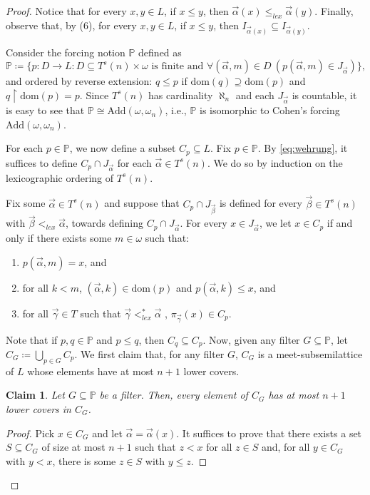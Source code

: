 \documentclass[]{amsart}
\newtheorem{claim}{Claim}[theorem]
\theoremstyle{definition}
\theoremstyle{remark}
\begin{document}
\begin{proof}
Notice that for every $x,y \in L$, if $x \le y$, then $\vec{\alpha}(x) \le_{lex}\vec{\alpha}(y)$. Finally, observe that, by (6), for every $x,y \in L$, if $x \le y$, then $I_{\vec{\alpha}(x)} \subseteq I_{\vec{\alpha}(y)}$.

Consider the forcing notion $\mathbb{P}$ defined as
\[
\mathbb{P} \coloneqq \big\{p:D \rightarrow L : D \subseteq T^s(n) \times \omega \text{ is finite and } \forall (\vec{\alpha}, m) \in D \ (p(\vec{\alpha}, m) \in J_{\vec{\alpha}})\big\},
\]
and ordered by reverse extension: $q \le p$ if $\mathrm{dom}(q) \supseteq \mathrm{dom}(p)$ and $q \upharpoonright \mathrm{dom}(p) = p$. Since $T^s(n)$ has cardinality $\aleph_n$ and each $J_{\vec{\alpha}}$ is countable, it is easy to see that $\mathbb{P} \cong \text{Add}(\omega, \omega_n)$, i.e., $\mathbb{P}$ is isomorphic to Cohen's forcing $\text{Add}(\omega, \omega_n)$.

For each $p \in \mathbb{P}$, we now define a subset $C_p \subseteq L$. Fix $p \in \mathbb{P}$. By \eqref{eq:wehrung}, it suffices to define $C_p \cap J_{\vec{\alpha}}$ for each  $\vec{\alpha} \in T^s(n)$. We do so by induction on the lexicographic ordering of $T^s(n)$. 

Fix some $\vec{\alpha} \in T^s(n)$ and suppose that $C_p \cap J_{\vec{\beta}}$ is defined for every $\vec{\beta} \in T^s(n)$ with $\vec{\beta} <_{lex} \vec{\alpha}$, towards defining $C_p \cap J_{\vec{\alpha}}$. For every $x \in J_{\vec{\alpha}}$, we let $x \in C_p$ if and only if there exists some $m \in \omega$ such that:
\begin{enumerate}[label=(\alph*)]
\item $p (\vec{\alpha}, m) = x$, and
\item for all $k < m$,  $(\vec{\alpha}, k) \in \mathrm{dom}(p)$ and $p(\vec{\alpha}, k) \le x$, and
\item for all $\vec{\gamma} \in T$ such that $\vec{\gamma} <_{lex}^* \vec{\alpha}$ ,  $\pi_{\vec{\gamma}}(x) \in C_p$.
\end{enumerate}
Note that if $p,q \in \mathbb{P}$ and $p \le q$, then $C_q \subseteq C_p$. Now, given any filter $G \subseteq \mathbb{P}$, let  $C_G \coloneqq \bigcup_{p \in G} C_p$. We first claim that, for any filter $G$, $C_G$ is a meet-subsemilattice of $L$ whose elements have at most $n+1$ lower covers.

\begin{claim}
Let $G\subseteq \mathbb{P}$ be a filter. Then, every element of $C_G$ has at most $n+1$ lower covers in $C_G$.
\end{claim}
\begin{proof}
Pick $x \in C_G$ and let $\vec{\alpha} = \vec{\alpha}(x)$. It suffices to prove that there exists a set $S \subseteq C_G$ of size at most $n+1$ such that $z < x$ for all $z \in S$ and, for all $y \in C_G$ with $y < x$, there is some $z \in S$ with $y \le z$.


\end{proof}
\end{proof}
\end{document}
